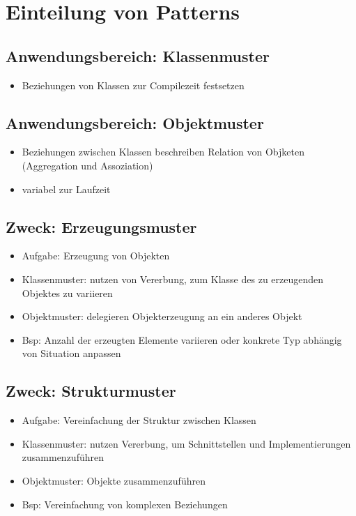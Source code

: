 \documentclass[11pt, fleqn, a4paper, leqno]{scrartcl} %
\begin{document}
	\section{Einteilung von Patterns}
		\subsection{Anwendungsbereich: Klassenmuster}
			\begin{itemize}
				\item Beziehungen von Klassen zur Compilezeit festsetzen
			\end{itemize}
		\subsection{Anwendungsbereich: Objektmuster}
			\begin{itemize}
				\item Beziehungen zwischen Klassen beschreiben Relation von Objketen (Aggregation und Assoziation)
				\item variabel zur Laufzeit
			\end{itemize}
		\subsection{Zweck: Erzeugungsmuster}
			\begin{itemize}
				\item Aufgabe: Erzeugung von Objekten
				\item Klassenmuster: nutzen von Vererbung, zum Klasse des zu erzeugenden Objektes zu variieren
				\item Objektmuster: delegieren Objekterzeugung an ein anderes Objekt
				\item Bsp: Anzahl der erzeugten Elemente variieren oder konkrete Typ abhängig von Situation anpassen		
			\end{itemize}
		\subsection{Zweck: Strukturmuster}
			\begin{itemize}
				\item Aufgabe: Vereinfachung der Struktur zwischen Klassen
				\item Klassenmuster: nutzen Vererbung, um Schnittstellen und Implementierungen zusammenzuführen
				\item Objektmuster: Objekte zusammenzuführen
				\item Bsp: Vereinfachung von komplexen Beziehungen		
			\end{itemize}
\end{document}
